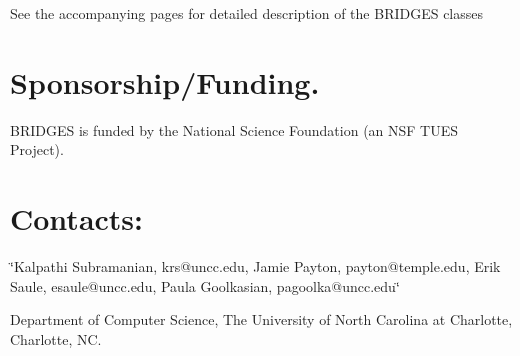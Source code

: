 See the accompanying pages for detailed description of the B\+R\+I\+D\+G\+ES classes \hypertarget{index_sponsor_sec}{}\section{Sponsorship/\+Funding.}\label{index_sponsor_sec}
B\+R\+I\+D\+G\+ES is funded by the National Science Foundation (an N\+SF T\+U\+ES Project).\hypertarget{index_contacts_sec}{}\section{Contacts\+:}\label{index_contacts_sec}
\char`\"{}\+Kalpathi Subramanian, krs@uncc.\+edu, Jamie Payton, payton@temple.\+edu,
  Erik Saule, esaule@uncc.\+edu, Paula Goolkasian, pagoolka@uncc.\+edu\char`\"{}

Department of Computer Science, The University of North Carolina at Charlotte, Charlotte, NC. 